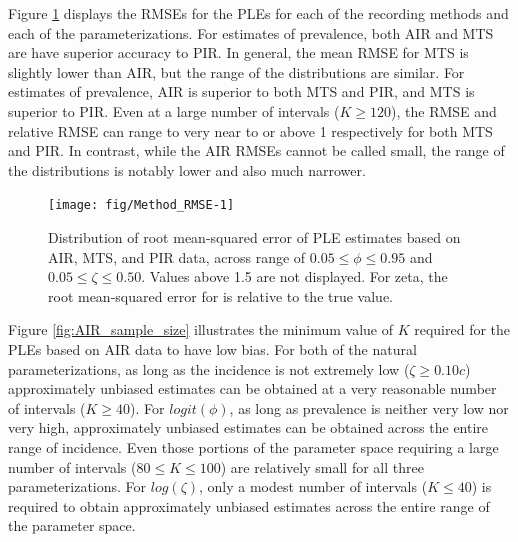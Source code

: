 \documentclass[man, noextraspace, floatsintext]{apa6}\usepackage[]{graphicx}\usepackage[]{color}
\newenvironment{knitrout}{}{} %
\begin{document}
Figure \ref{fig:Method_RMSE} displays the RMSEs for the PLEs for each of the recording methods and each of the parameterizations. For estimates of prevalence, both AIR and MTS are have superior accuracy to PIR. In general, the mean RMSE for MTS is slightly lower than AIR, but the range of the distributions are similar. For estimates of prevalence, AIR is superior to both MTS and PIR, and MTS is superior to PIR. Even at a large number of intervals ($K \geq 120$), the RMSE and relative RMSE can range to very near to or above 1 respectively for both MTS and PIR. In contrast, while the AIR RMSEs cannot be called small, the range of the distributions is notably lower and also much narrower.
\begin{knitrout}
\color{fgcolor}\begin{figure}

{\centering \texttt{[image: fig/Method\_RMSE-1]} 

}

\caption[Distribution of root mean-squared error of PLE estimates based on AIR, MTS, and PIR data, across range of ]{Distribution of root mean-squared error of PLE estimates based on AIR, MTS, and PIR data, across range of $0.05 \leq \phi \leq 0.95$ and $0.05 \leq \zeta \leq 0.50$. Values above 1.5 are not displayed. For zeta, the root mean-squared error for is relative to the true value.}\label{fig:Method_RMSE}
\end{figure}


\end{knitrout}

Figure \ref{fig:AIR_sample_size} illustrates the minimum value of $K$ required for the PLEs based on AIR data to have low bias. For both of the natural parameterizations, as long as the incidence is not extremely low ($\zeta \geq 0.10c$) approximately unbiased estimates can be obtained at a very reasonable number of intervals ($K \geq 40$). For $logit(\phi)$, as long as prevalence is neither very low nor very high, approximately unbiased estimates can be obtained across the entire range of incidence. Even those portions of the parameter space requiring a large number of intervals ($80 \leq K \leq 100$) are relatively small for all three parameterizations. For $log(\zeta)$, only a modest number of intervals ($K \leq 40$) is required to obtain approximately unbiased estimates across the entire range of the parameter space.
\end{document}
